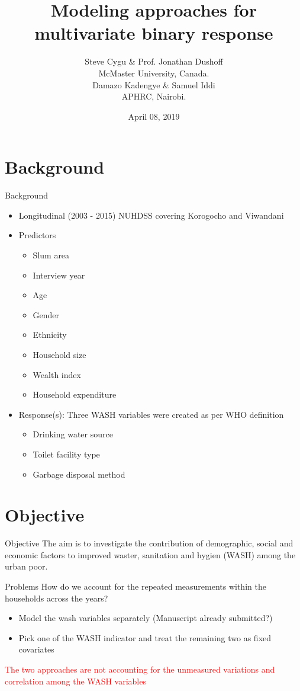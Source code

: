 \documentclass{beamer}
\title{Modeling approaches for multivariate binary response}
\author{Steve Cygu \& Prof. Jonathan Dushoff\\ McMaster University, Canada.\\ \vspace{1cm} Damazo Kadengye \& Samuel Iddi\\ APHRC, Nairobi.}
\date{April 08, 2019}
\begin{document}
\frame{\titlepage}



\section{Background}

\begin{frame}{Background}
\begin{itemize}[<+->]
\item Longitudinal (2003 - 2015) NUHDSS covering Korogocho and Viwandani
\item Predictors
\begin{itemize}[<+->]
\item Slum area
\item Interview year
\item Age
\item Gender
\item Ethnicity
\item Household size
\item Wealth index
\item Household expenditure
\end{itemize}
\item Response(s): Three WASH variables were created as per WHO definition

\begin{itemize}[<+->]
\item Drinking water source
\item Toilet facility type
\item Garbage disposal method
\end{itemize}
\end{itemize}

\end{frame}


\section{Objective}

\begin{frame}{Objective}
The aim is to investigate the contribution of demographic, social and economic factors to improved waster, sanitation and hygien (WASH) among the urban poor.
\end{frame}

\begin{frame}{Problems}
How do we account for the repeated measurements within the households across the years?
\begin{itemize}[<+->]
\item Model the wash variables separately (Manuscript already submitted?)
\item Pick one of the WASH indicator and treat the remaining two as fixed covariates
\end{itemize}
\pause
\textcolor{red}{The two approaches are not accounting for the unmeasured variations and correlation among the WASH variables} 
\end{frame}
\end{document}

